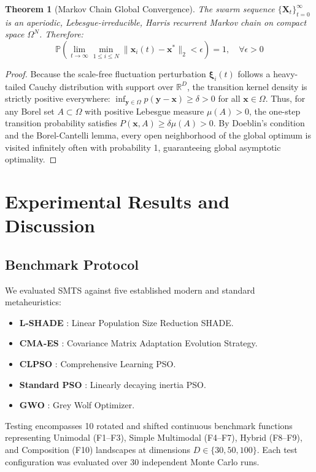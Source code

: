 \documentclass[journal]{IEEEtran}
\newtheorem{theorem}{Theorem}
\begin{document}
\begin{theorem}[Markov Chain Global Convergence]
\label{thm:markov}
The swarm sequence $\{\mathbf{X}_t\}_{t=0}^\infty$ is an aperiodic, Lebesgue-irreducible, Harris recurrent Markov chain on compact space $\Omega^N$. Therefore:
\begin{equation}
\mathbb{P}\left( \lim_{t \to \infty} \min_{1 \le i \le N} \|\mathbf{x}_i(t) - \mathbf{x}^*\|_2 < \epsilon \right) = 1, \quad \forall \epsilon > 0
\end{equation}
\end{theorem}
\begin{proof}
Because the scale-free fluctuation perturbation $\boldsymbol{\xi}_i(t)$ follows a heavy-tailed Cauchy distribution with support over $\mathbb{R}^D$, the transition kernel density is strictly positive everywhere: $\inf_{\mathbf{y} \in \Omega} p(\mathbf{y} - \mathbf{x}) \ge \delta > 0$ for all $\mathbf{x} \in \Omega$. Thus, for any Borel set $A \subset \Omega$ with positive Lebesgue measure $\mu(A) > 0$, the one-step transition probability satisfies $P(\mathbf{x}, A) \ge \delta \mu(A) > 0$. By Doeblin's condition and the Borel-Cantelli lemma, every open neighborhood of the global optimum is visited infinitely often with probability 1, guaranteeing global asymptotic optimality.
\end{proof}

\section{Experimental Results and Discussion}

\subsection{Benchmark Protocol}
We evaluated SMTS against five established modern and standard metaheuristics:
\begin{itemize}
    \item \textbf{L-SHADE} \cite{tanabe2014improving}: Linear Population Size Reduction SHADE.
    \item \textbf{CMA-ES} \cite{hansen2016cma}: Covariance Matrix Adaptation Evolution Strategy.
    \item \textbf{CLPSO} \cite{liang2006comprehensive}: Comprehensive Learning PSO.
    \item \textbf{Standard PSO} \cite{kennedy1995particle}: Linearly decaying inertia PSO.
    \item \textbf{GWO} \cite{mirjalili2014grey}: Grey Wolf Optimizer.
\end{itemize}
Testing encompasses 10 rotated and shifted continuous benchmark functions representing Unimodal (F1--F3), Simple Multimodal (F4--F7), Hybrid (F8--F9), and Composition (F10) landscapes at dimensions $D \in \{30, 50, 100\}$. Each test configuration was evaluated over 30 independent Monte Carlo runs.
\end{document}
